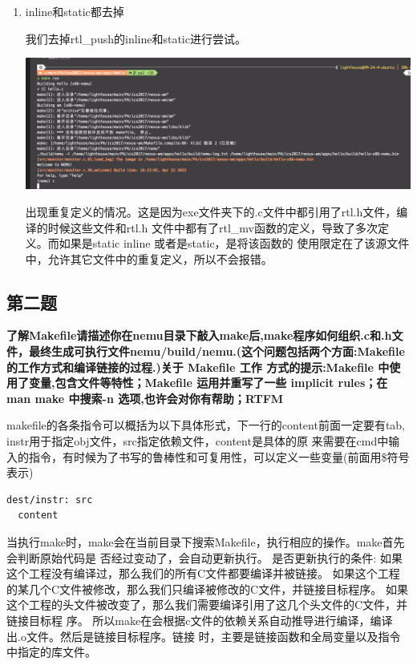 \documentclass[UTF8,a4paper,10pt]{ctexart}
\begin{document}
\begin{enumerate}
  \item inline和static都去掉
  
  我们去掉rtl\_push的inline和static进行尝试。
  \begin{center}
    \includegraphics*[scale = 0.25]{false}
  \end{center}
  出现重复定义的情况。这是因为exe文件夹下的.c文件中都引用了rtl.h文件，编译的时候这些文件和rtl.h 文件中都有了rtl\_mv函数的定义，导致了多次定义。而如果是static inline 或者是static，是将该函数的 使用限定在了该源文件中，允许其它文件中的重复定义，所以不会报错。


\end{enumerate}

\subsection{第二题}
\textbf{了解Makefile请描述你在nemu目录下敲入make后,make程序如何组织.c和.h文件，最终生成可执行文件nemu/build/nemu.(这个问题包括两个方面:Makefile 的工作方式和编译链接的过程.)关于 Makefile 工作 方式的提示:Makefile 中使用了变量,包含文件等特性；Makefile 运用并重写了一些 implicit rules；在 man make 中搜索-n 选项,也许会对你有帮助；RTFM}

makefile的各条指令可以概括为以下具体形式，下一行的content前面一定要有tab, instr用于指定obj文件，src指定依赖文件，content是具体的原 来需要在cmd中输入的指令，有时候为了书写的鲁棒性和可复用性，可以定义一些变量(前面用\$符号 表示)
\begin{lstlisting}[]
dest/instr: src
  content
\end{lstlisting}
当执行make时，make会在当前目录下搜索Makefile，执行相应的操作。make首先会判断原始代码是 否经过变动了，会自动更新执行。
是否更新执行的条件:
如果这个工程没有编译过，那么我们的所有C文件都要编译并被链接。 如果这个工程的某几个C文件被修改，那么我们只编译被修改的C文件，并链接目标程序。 如果这个工程的头文件被改变了，那么我们需要编译引用了这几个头文件的C文件，并链接目标程 序。
所以make在会根据c文件的依赖关系自动推导进行编译，编译出.o文件。然后是链接目标程序。链接 时，主要是链接函数和全局变量以及指令中指定的库文件。
\end{document}
